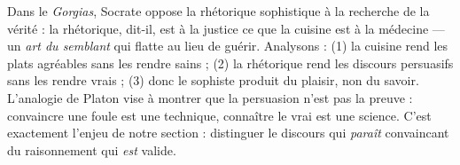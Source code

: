 \documentclass[11pt]{article}
\begin{document}
\begin{experience}
Dans le \emph{Gorgias}, Socrate oppose la rhétorique sophistique à la recherche de la vérité : la rhétorique, dit-il, est à la justice ce que la cuisine est à la médecine — un \emph{art du semblant} qui flatte au lieu de guérir. Analysons : (1) la cuisine rend les plats agréables sans les rendre sains ; (2) la rhétorique rend les discours persuasifs sans les rendre vrais ; (3) donc le sophiste produit du plaisir, non du savoir. L'analogie de Platon vise à montrer que la persuasion n'est pas la preuve : convaincre une foule est une technique, connaître le vrai est une science. C'est exactement l'enjeu de notre section : distinguer le discours qui \emph{paraît} convaincant du raisonnement qui \emph{est} valide.
\end{experience}
\end{document}
